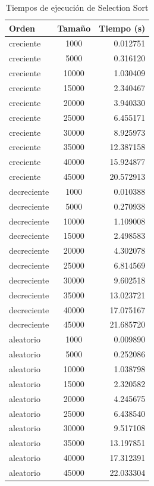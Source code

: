 \documentclass[a4paper, 11pt]{article}
\begin{document}
\begin{table}[H]
\centering
\begin{tabular}{|l|c|r|}
\hline
Orden & Tamaño & Tiempo (s) \\
\hline
creciente & 1000 & 0.012751 \\
creciente & 5000 & 0.316120 \\
creciente & 10000 & 1.030409 \\
creciente & 15000 & 2.340467 \\
creciente & 20000 & 3.940330 \\
creciente & 25000 & 6.455171 \\
creciente & 30000 & 8.925973 \\
creciente & 35000 & 12.387158 \\
creciente & 40000 & 15.924877 \\
creciente & 45000 & 20.572913 \\
\hline
decreciente & 1000 & 0.010388 \\
decreciente & 5000 & 0.270938 \\
decreciente & 10000 & 1.109008 \\
decreciente & 15000 & 2.498583 \\
decreciente & 20000 & 4.302078 \\
decreciente & 25000 & 6.814569 \\
decreciente & 30000 & 9.602518 \\
decreciente & 35000 & 13.023721 \\
decreciente & 40000 & 17.075167 \\
decreciente & 45000 & 21.685720 \\
\hline
aleatorio & 1000 & 0.009890 \\
aleatorio & 5000 & 0.252086 \\
aleatorio & 10000 & 1.038798 \\
aleatorio & 15000 & 2.320582 \\
aleatorio & 20000 & 4.245675 \\
aleatorio & 25000 & 6.438540 \\
aleatorio & 30000 & 9.517108 \\
aleatorio & 35000 & 13.197851 \\
aleatorio & 40000 & 17.312391 \\
aleatorio & 45000 & 22.033304 \\
\hline
\end{tabular}
\caption{Tiempos de ejecución de Selection Sort}
\label{tab:selection_results}
\end{table}
\end{document}
